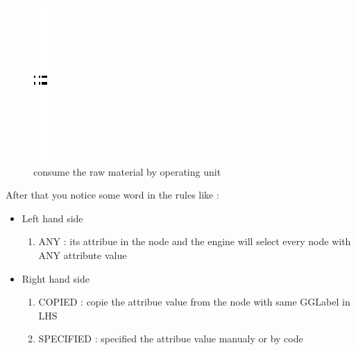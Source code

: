 \begin{figure}[th]
\centering
		\quad{}\quad{}
			\includegraphics{Chapiter3/img/sep}
	\quad{}\quad{}
\caption{\label{fig:consume the raw material by operating unit} consume the raw material by operating unit}
\end{figure}
\pagebreak
After that you notice some word in the rules like  :
\begin{itemize}
\item Left hand side
	\begin{enumerate}
	\item ANY : its attribue in the node and the engine will select every node with ANY attribute value
	\end{enumerate}
\item  Right hand side
	\begin{enumerate}
	\item COPIED : copie the attribue value from the node with same GGLabel in LHS
	\item SPECIFIED : specified the attribue value manualy or by code 
	\end{enumerate}
\end{itemize}
 
